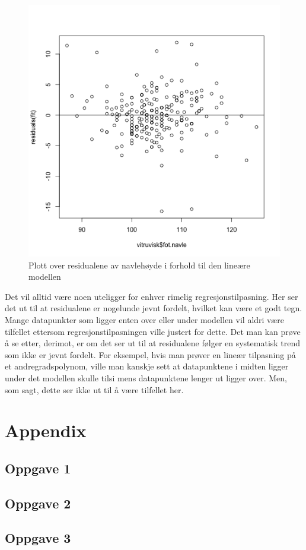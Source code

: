 \begin{figure}[H]
        \centering
        \includegraphics[width=0.7\linewidth]{3H.pdf}
        \caption{Plott over residualene av navlehøyde i forhold til den lineære modellen}
        \label{fig:3H}
\end{figure}

Det vil alltid være noen uteligger for enhver rimelig regresjonstilpasning. Her ser det ut til at residualene er nogelunde jevnt fordelt, hvilket kan være et godt tegn. Mange datapunkter som ligger enten over eller under modellen vil aldri være tilfellet ettersom regresjonstilpasningen ville justert for dette. Det man kan prøve å se etter, derimot, er om det ser ut til at residualene følger en systematisk trend som ikke er jevnt fordelt. For eksempel, hvis man prøver en lineær tilpasning på et andregradspolynom, ville man kanskje sett at datapunktene i midten ligger under det modellen skulle tilsi mens datapunktene lenger ut ligger over. Men, som sagt, dette ser ikke ut til å være tilfellet her.

\pagebreak

\section*{Appendix}
\subsection{Oppgave 1}

\newpage
\subsection{Oppgave 2}

\newpage
\subsection{Oppgave 3}


